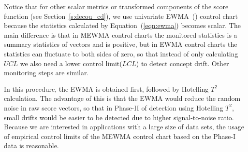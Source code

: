 \documentclass[twoside,11pt]{article}
\begin{document}
Notice that for other scalar metrics or transformed components of the score function (see Section~\ref{s:decou_cd}), we use univariate EWMA~(\cite{roberts1959control}) control chart because the statistics calculated by Equation~(\ref{eqn:ewma}) becomes scalar. The main difference is that in MEWMA control charts the monitored statistics is a summary statistics of vectors and is positive, but in EWMA control charts the statistics can fluctuate to both sides of zero, so that instead of only calculating $UCL$ we also need a lower control limit($LCL$) to detect concept drift. Other monitoring steps are similar.

In this procedure, the EWMA is obtained first, followed by Hotelling $T^2$ calculation. The advantage of this is that the EWMA would reduce the random noise in raw score vectors, so that in Phase-II of detection using Hotelling $T^2$, small drifts would be easier to be detected due to higher signal-to-noise ratio. Because we are interested in applications with a large size of data sets, the usage of empirical control limits of the MEWMA control chart based on the Phase-I data is reasonable.

\end{document}
